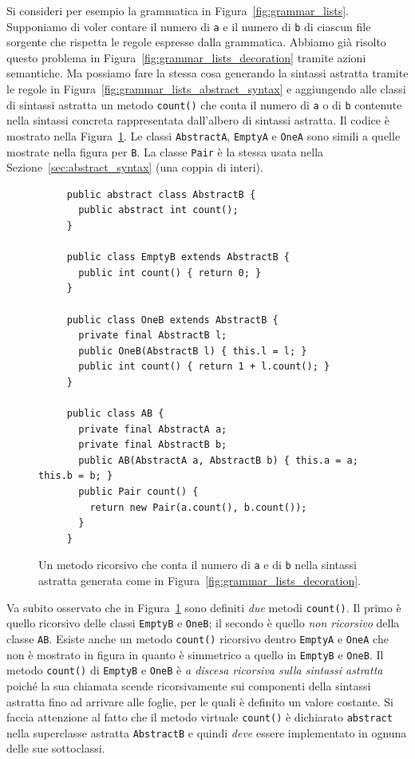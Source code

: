 Si consideri per esempio la grammatica in Figura~\ref{fig:grammar_lists}.
Supponiamo di voler contare
il numero di \texttt{a} e il numero di \texttt{b} di ciascun file sorgente
che rispetta le regole espresse dalla grammatica. Abbiamo gi\`a risolto questo
problema in Figura~\ref{fig:grammar_lists_decoration} tramite azioni
semantiche. Ma possiamo fare la stessa cosa generando la sintassi astratta
tramite le regole in Figura~\ref{fig:grammar_lists_abstract_syntax} e
aggiungendo alle classi di sintassi astratta un metodo
\texttt{count()} che conta il numero di \texttt{a} o di \texttt{b}
contenute nella sintassi concreta rappresentata dall'albero di sintassi
astratta. Il codice \`e mostrato nella Figura~\ref{fig:grammar_lists_count}.
Le classi \texttt{AbstractA}, \texttt{EmptyA} e \texttt{OneA} sono
simili a quelle mostrate nella figura per \texttt{B}.
La classe \texttt{Pair} \`e la
stessa usata nella Sezione~\ref{sec:abstract_syntax} (una coppia di interi).
%
\begin{figure}[t]
\begin{verbatim}
     public abstract class AbstractB {
       public abstract int count();
     }

     public class EmptyB extends AbstractB {
       public int count() { return 0; }
     }

     public class OneB extends AbstractB {
       private final AbstractB l;
       public OneB(AbstractB l) { this.l = l; }
       public int count() { return 1 + l.count(); }
     }

     public class AB {
       private final AbstractA a;
       private final AbstractB b;
       public AB(AbstractA a, AbstractB b) { this.a = a; this.b = b; }
       public Pair count() {
         return new Pair(a.count(), b.count());
       }
     }
\end{verbatim}
\caption{Un metodo ricorsivo che conta il numero di \texttt{a} e di \texttt{b}
         nella sintassi astratta generata come in
         Figura~\ref{fig:grammar_lists_decoration}.}
  \label{fig:grammar_lists_count}
\end{figure}

Va subito osservato che in Figura~\ref{fig:grammar_lists_count} sono
definiti \emph{due} metodi \texttt{count()}. Il primo \`e quello
ricorsivo delle classi \texttt{EmptyB} e \texttt{OneB}; il secondo \`e quello
\emph{non ricorsivo} della classe \texttt{AB}. Esiste anche un metodo
\texttt{count()} ricorsivo dentro \texttt{EmptyA} e \texttt{OneA} che non
\`e mostrato in figura in quanto \`e simmetrico a quello in
\texttt{EmptyB} e \texttt{OneB}.
Il metodo \texttt{count()} di \texttt{EmptyB} e \texttt{OneB} \`e
\emph{a discesa ricorsiva sulla sintassi astratta} poich\'e la sua
chiamata scende ricorsivamente sui componenti della sintassi astratta fino
ad arrivare alle foglie, per le quali \`e definito un valore costante.
Si faccia attenzione al fatto che
il metodo virtuale \texttt{count()} \`e dichiarato
\texttt{abstract} nella superclasse astratta \texttt{AbstractB} e quindi
\emph{deve} essere implementato in ognuna delle sue sottoclassi.

